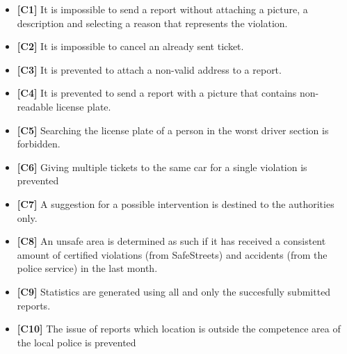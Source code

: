 \begin{itemize}
		\item \textbf{[\hypertarget{C1}{C1}]} It is impossible to send a report without attaching a picture, a description and selecting a reason that represents the violation. 
		\item \textbf{[\hypertarget{C2}{C2}]} It is impossible to cancel an already sent ticket. 
		\item \textbf{[\hypertarget{C3}{C3}]} It is prevented to attach a non-valid address to a report.
		\item \textbf{[\hypertarget{C4}{C4}]} It is prevented to send a report with a picture that contains non-readable license plate. 
		\item \textbf{[\hypertarget{C5}{C5}]} Searching the license plate of a person in the worst driver section is forbidden.
		\item \textbf{[\hypertarget{C6}{C6}]} Giving multiple tickets to the same car for a single violation is prevented
		\item \textbf{[\hypertarget{C7}{C7}]} A suggestion for a possible intervention is destined to the authorities only.
		\item \textbf{[\hypertarget{C8}{C8}]} An unsafe area is determined as such if it has received a consistent amount of certified violations (from SafeStreets) and accidents (from the police service) in the last month. 
		\item \textbf{[\hypertarget{C9}{C9}]} Statistics are generated using all and only the succesfully submitted reports.
		\item \textbf{[\hypertarget{C10}{C10}]} The issue of reports which location is outside the competence area of the local police is prevented
		
	\end{itemize}
\clearpage
